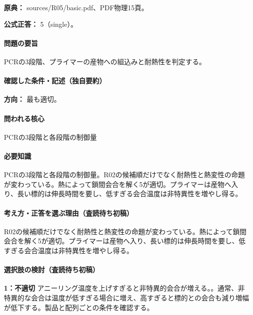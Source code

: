 \noindent\textbf{原典：} sources/R05/basic.pdf、PDF物理15頁。

\textbf{公式正答：} 5（single）。

\paragraph{問題の要旨} PCRの3段階、プライマーの産物への組込みと耐熱性を判定する。

\paragraph{確認した条件・記述（独自要約）}\mbox{}\par

\noindent\textbf{方向：} 最も適切。\par

\paragraph{問われる核心} PCRの3段階と各段階の制御量

\paragraph{必要知識} PCRの3段階と各段階の制御量。R02の候補順だけでなく耐熱性と熱変性の命題が変わっている。熱によって鎖間会合を解く5が適切。プライマーは産物へ入り、長い標的は伸長時間を要し、低すぎる会合温度は非特異性を増やし得る。

\paragraph{考え方・正答を選ぶ理由（査読待ち初稿）} R02の候補順だけでなく耐熱性と熱変性の命題が変わっている。熱によって鎖間会合を解く5が適切。プライマーは産物へ入り、長い標的は伸長時間を要し、低すぎる会合温度は非特異性を増やし得る。

\paragraph{選択肢の検討（査読待ち初稿）}\mbox{}\par

\noindent\textbf{1：不適切} アニーリング温度を上げすぎると非特異的会合が増える。。通常、非特異的な会合は温度が低すぎる場合に増え、高すぎると標的との会合も減り増幅が低下する。製品と配列ごとの条件を確認する。\par

